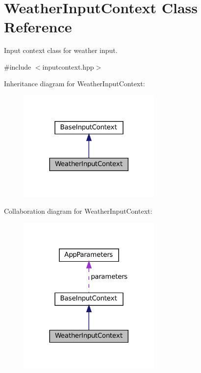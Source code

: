 \hypertarget{classWeatherInputContext}{}\section{Weather\+Input\+Context Class Reference}
\label{classWeatherInputContext}


Input context class for weather input.  




{\ttfamily \#include $<$inputcontext.\+hpp$>$}



Inheritance diagram for Weather\+Input\+Context\+:\nopagebreak
\begin{figure}[H]
\begin{center}
\leavevmode
\includegraphics[width=200pt]{classWeatherInputContext__inherit__graph}
\end{center}
\end{figure}


Collaboration diagram for Weather\+Input\+Context\+:\nopagebreak
\begin{figure}[H]
\begin{center}
\leavevmode
\includegraphics[width=200pt]{classWeatherInputContext__coll__graph}
\end{center}
\end{figure}

